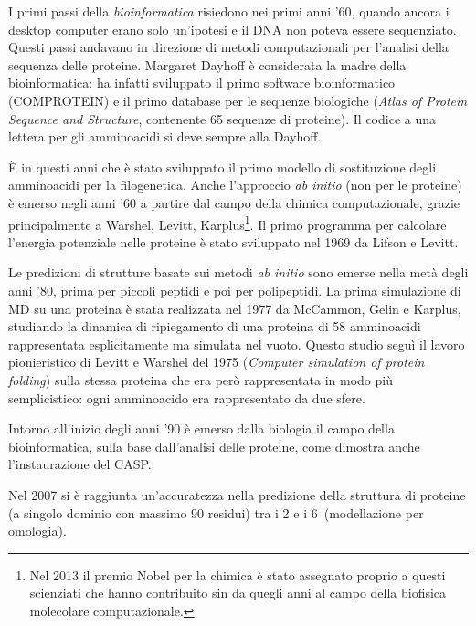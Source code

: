 I primi passi della \textit{bioinformatica }risiedono nei primi anni '60, quando ancora i desktop computer erano solo un'ipotesi e il DNA non poteva essere sequenziato. Questi passi andavano in direzione di metodi computazionali per l'analisi della sequenza delle proteine. Margaret Dayhoff è considerata la madre della bioinformatica: ha infatti sviluppato il primo software bioinformatico (COMPROTEIN) e il primo database per le sequenze biologiche (\textit{Atlas of Protein Sequence and Structure}, contenente 65 sequenze di proteine). Il codice a una lettera per gli amminoacidi si deve sempre alla Dayhoff\supercite{gauthier2019brief}. 

\par È in questi anni che è stato sviluppato il primo modello di sostituzione degli amminoacidi per la filogenetica. Anche l'approccio \textit{ab initio} (non per le proteine) è emerso negli anni '60 a partire dal campo della chimica computazionale, grazie principalmente a Warshel, Levitt, Karplus\footnote{Nel 2013 il premio Nobel per la chimica è stato assegnato proprio a questi scienziati che hanno contribuito sin da quegli anni al campo della biofisica molecolare computazionale.}. Il primo programma per calcolare l'energia potenziale nelle proteine è stato sviluppato nel 1969 da Lifson e Levitt\supercite{levitt1969refinement}.

\par Le predizioni di strutture basate sui metodi \textit{ab initio} sono emerse nella metà degli anni '80, prima per piccoli peptidi e poi per polipeptidi. La prima simulazione di MD su una proteina è stata realizzata nel 1977 da McCammon, Gelin e Karplus\supercite{mccammon1977dynamics}, studiando la dinamica di ripiegamento di una proteina di 58 amminoacidi rappresentata esplicitamente ma simulata nel vuoto. Questo studio seguì il lavoro pionieristico di Levitt e Warshel del 1975 (\textit{Computer simulation of protein folding}\supercite{levitt1975computer}) sulla stessa proteina che era però rappresentata in modo più semplicistico: ogni amminoacido era rappresentato da due sfere. 

\par Intorno all'inizio degli anni '90 è emerso dalla biologia il campo della bioinformatica, sulla base dall'analisi delle proteine, come dimostra anche l'instaurazione del CASP.

\par Nel 2007 si è raggiunta un'accuratezza nella predizione della struttura di proteine (a singolo dominio con massimo 90 residui) tra i 2 e i 6 \angstrom    $\,$(modellazione per omologia)\supercite{dill2008protein}.

